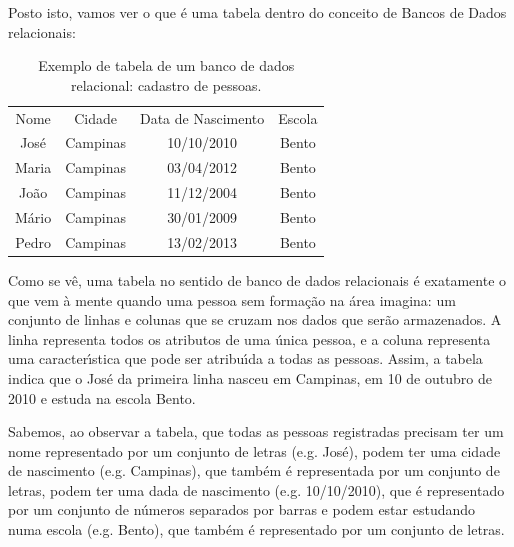 \documentclass[
12pt,		%
openright,	%
twoside,  %
a4paper,			%
chapter=TITLE,		%
english,			%
french,				%
spanish,			%
brazil				%
]{USPSC-classe/USPSC}
\begin{document}
Posto isto, vamos ver o que \'e uma tabela dentro do conceito de Bancos de Dados relacionais:














\begin{table}[htb]
\tiny
\caption{\label{f66c1ac239a347d2b455611f794c18300b1974b6}Exemplo de tabela de um banco de dados relacional: cadastro de pessoas.}

\centering
\begin{tabular}{|c|c|c|c|}
\hline
Nome  &  Cidade  &  Data de Nascimento  &  Escola \\
Jos\'e  &  Campinas  &  10/10/2010  &  Bento \\
Maria  &  Campinas  &  03/04/2012  &  Bento \\
Jo\~ao  &  Campinas  &  11/12/2004  &  Bento \\
M\'ario  &  Campinas  &  30/01/2009  &  Bento \\
Pedro  &  Campinas  &  13/02/2013  &  Bento \\
\hline
\end{tabular}
\end{table}


Como se v\^e, uma tabela no sentido de banco de dados relacionais \'e exatamente o que vem \`a mente quando uma pessoa sem forma\c{c}\~ao na \'area imagina: um conjunto de linhas e colunas que se cruzam nos dados que ser\~ao armazenados. A linha representa todos os atributos de uma \'unica pessoa, e a coluna representa uma caracter\'{\i}stica que pode ser atribu\'{\i}da a todas as pessoas. Assim, a tabela indica que o  Jos\'e da primeira linha nasceu em Campinas, em 10 de outubro de 2010 e estuda na escola Bento.










Sabemos, ao observar a tabela, que todas as pessoas registradas precisam ter um nome representado por um conjunto de letras (e.g. Jos\'e), podem ter uma cidade de nascimento (e.g. Campinas), que tamb\'em \'e representada por um conjunto de letras, podem ter uma dada de nascimento (e.g. 10/10/2010), que \'e representado por um conjunto de n\'umeros separados por barras e podem estar estudando numa escola (e.g. Bento), que tamb\'em \'e representado por um conjunto de letras.
\end{document}
